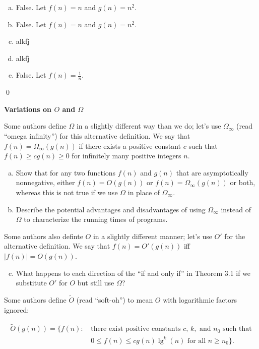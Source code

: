 \sol \begin{enumerate}[(a)]
    \item False. Let $f(n) = n$ and $g(n) = n^2$.
    \item False. Let $f(n) = n$ and $g(n) = n^2$.
    \item alkfj
    \item alkfj
    \item False. Let $f(n) = \frac{1}{n}$.
\end{enumerate}\qed

 \textbf{Variations on $O$ and $\Omega$}

Some authors define $\Omega$ in a slightly different way than we do; let's use $\Omega_\infty$ (read ``omega infinity'') for this alternative definition. We say that $f(n) = \Omega_\infty(g(n))$ if there exists a positive constant $c$ such that $f(n) \geq cg(n) \geq 0$ for infinitely many positive integers $n$.

\begin{enumerate}[(a)]
    \item Show that for any two functions $f(n)$ and $g(n)$ that are asymptotically nonnegative, either $f(n) = O(g(n))$ or $f(n) = \Omega_\infty (g(n))$ or both, whereas this is not true if we use $\Omega$ in place of $\Omega_\infty$.
    \item Describe the potential advantages and disadvantages of using $\Omega_\infty$ instead of $\Omega$ to characterize the running times of programs.
\end{enumerate}

Some authors also definte $O$ in a slightly different manner; let's use $O'$ for the alternative definition. We say that $f(n) = O'(g(n))$ iff $|f(n)| = O(g(n))$.

\begin{enumerate}[(a)]
    \setcounter{enumi}{2}
    \item What happens to each direction of the ``if and only if'' in Theorem 3.1 if we substitute $O'$ for $O$ but still use $\Omega$?
\end{enumerate}

Some authors define $\tilde{O}$ (read ``soft-oh'') to mean $O$ with logarithmic factors ignored:

\begin{align*}
\tilde{O}(g(n)) = \{f(n) : \, & \text{there exist positive constants } c, \, k, \text{ and } n_0 \text{ such that} \\
& 0 \leq f(n) \leq cg(n) \lg^k (n) \text{ for all } n \geq n_0\}.
\end{align*}

